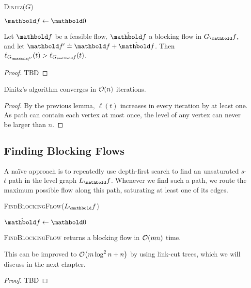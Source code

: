 \begin{algorithm}
    \caption{\textsc{Dinitz($G$)}}
    $\vf \gets \vZero$\;
    \Return{$\vf$}
\end{algorithm}

\begin{lem}
Let $\vf$ be a feasible flow, $\hat{\vf}$ a blocking flow in $G_\vf$, and let $\vf' \defeq \vf + \hat{\vf}$. Then $\ell_{G_{\vf'}}(t) > \ell_{G_\vf}(t)$.
\end{lem}
\begin{proof}
TBD
\end{proof}

\begin{thm}[Dinitz]
Dinitz's algorithm converges in $\LandauO{n}$ iterations.
\end{thm}
\begin{proof}
By the previous lemma, $\ell(t)$ increases in every iteration by at least one. As path can contain each vertex at most once, the level of any vertex can never be larger than $n$.
\end{proof}

\subsection{Finding Blocking Flows}

A naïve approach is to repeatedly use depth-first search to find an unsaturated $s$-$t$ path in the level graph $L_\vf$. Whenever we find such a path, we route the maximum possible flow along this path, saturating at least one of its edges.

\begin{algorithm}
    \caption{\textsc{FindBlockingFlow($L_\vf$)}}
    $\hat{\vf} \gets \vZero$\;
    \Return{$\hat{\vf}$}
\end{algorithm}

\begin{lem}
\textsc{FindBlockingFlow} returns a blocking flow in $\LandauO{mn}$ time.
\end{lem}
\begin{rmk}
This can be improved to $\LandauO{m \log^2 n + n}$ by using link-cut trees, which we will discuss in the next chapter.
\end{rmk}
\begin{proof}
TBD
\end{proof}

